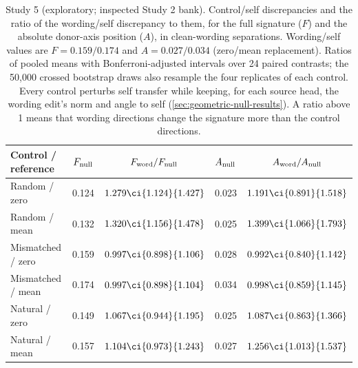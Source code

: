 \begin{table}[t]
\centering\small
\setlength{\tabcolsep}{3pt}
\caption{Study 5 (exploratory; inspected Study 2 bank). Control/self discrepancies and the ratio of the wording/self discrepancy to them, for the full signature ($F$) and the absolute donor-axis position ($A$), in clean-wording separations. Wording/self values are $F=0.159/0.174$ and $A=0.027/0.034$ (zero/mean replacement). Ratios of pooled means with Bonferroni-adjusted intervals over 24 paired contrasts; the 50,000 crossed bootstrap draws also resample the four replicates of each control. Every control perturbs self transfer while keeping, for each source head, the wording edit's norm and angle to self (\cref{sec:geometric-null-results}). A ratio above 1 means that wording directions change the signature more than the control directions.}
\label{tab:geometric-null-ratios}
\begin{tabular}{@{}lcccc@{}}
\toprule
Control / reference & $F_{\rm null}$ & $F_{\rm word}/F_{\rm null}$ & $A_{\rm null}$ & $A_{\rm word}/A_{\rm null}$ \\
\midrule
Random / zero & 0.124 & $1.279\ci{1.124}{1.427}$ & 0.023 & $1.191\ci{0.891}{1.518}$ \\
Random / mean & 0.132 & $1.320\ci{1.156}{1.478}$ & 0.025 & $1.399\ci{1.066}{1.793}$ \\
Mismatched / zero & 0.159 & $0.997\ci{0.898}{1.106}$ & 0.028 & $0.992\ci{0.840}{1.142}$ \\
Mismatched / mean & 0.174 & $0.997\ci{0.898}{1.104}$ & 0.034 & $0.998\ci{0.859}{1.145}$ \\
Natural / zero & 0.149 & $1.067\ci{0.944}{1.195}$ & 0.025 & $1.087\ci{0.863}{1.366}$ \\
Natural / mean & 0.157 & $1.104\ci{0.973}{1.243}$ & 0.027 & $1.256\ci{1.013}{1.537}$ \\
\bottomrule
\end{tabular}
\end{table}
